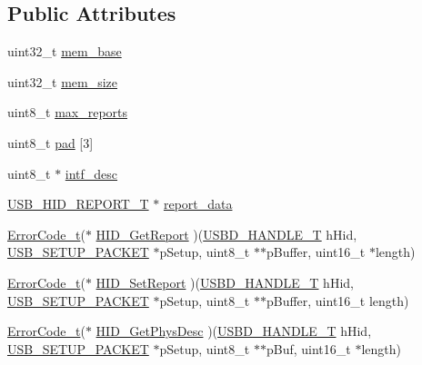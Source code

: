 \subsection*{Public Attributes}
\begin{DoxyCompactItemize}
\item 
uint32\+\_\+t \hyperlink{struct_u_s_b_d___h_i_d___i_n_i_t___p_a_r_a_m_aa53ec81868fce2b2ec22b3053f9d000a}{mem\+\_\+base}
\item 
uint32\+\_\+t \hyperlink{struct_u_s_b_d___h_i_d___i_n_i_t___p_a_r_a_m_a79aeddb1f4f4c9d77cacd17cf6c26499}{mem\+\_\+size}
\item 
uint8\+\_\+t \hyperlink{struct_u_s_b_d___h_i_d___i_n_i_t___p_a_r_a_m_a40d5967d9d4a156395871f4af996a15f}{max\+\_\+reports}
\item 
uint8\+\_\+t \hyperlink{struct_u_s_b_d___h_i_d___i_n_i_t___p_a_r_a_m_abe66157322df2a9f655708b8ae2795e9}{pad} \mbox{[}3\mbox{]}
\item 
uint8\+\_\+t $\ast$ \hyperlink{struct_u_s_b_d___h_i_d___i_n_i_t___p_a_r_a_m_ac1479de61c27a705a2df0e3941744671}{intf\+\_\+desc}
\item 
\hyperlink{group___u_s_b_d___h_i_d_gaaa1686adb431783ea4357e6899c0d39d}{U\+S\+B\+\_\+\+H\+I\+D\+\_\+\+R\+E\+P\+O\+R\+T\+\_\+T} $\ast$ \hyperlink{struct_u_s_b_d___h_i_d___i_n_i_t___p_a_r_a_m_a2e46476d82b7859a239feeadf457d0e8}{report\+\_\+data}
\item 
\hyperlink{error_8h_a905255056c349318139d94aa4523d516}{Error\+Code\+\_\+t}($\ast$ \hyperlink{struct_u_s_b_d___h_i_d___i_n_i_t___p_a_r_a_m_a6d109bfb14cb50b59193b1e767dadfce}{H\+I\+D\+\_\+\+Get\+Report} )(\hyperlink{group___u_s_b_d___core_gafdbb2204d929cb9d75736bd2b42342ac}{U\+S\+B\+D\+\_\+\+H\+A\+N\+D\+L\+E\+\_\+T} h\+Hid, \hyperlink{group___u_s_b_d___core_ga4a940f7627cc7e9f0bb693cc0fce8637}{U\+S\+B\+\_\+\+S\+E\+T\+U\+P\+\_\+\+P\+A\+C\+K\+ET} $\ast$p\+Setup, uint8\+\_\+t $\ast$$\ast$p\+Buffer, uint16\+\_\+t $\ast$length)
\item 
\hyperlink{error_8h_a905255056c349318139d94aa4523d516}{Error\+Code\+\_\+t}($\ast$ \hyperlink{struct_u_s_b_d___h_i_d___i_n_i_t___p_a_r_a_m_ac4269c1416c60a84e121763e6a7106c3}{H\+I\+D\+\_\+\+Set\+Report} )(\hyperlink{group___u_s_b_d___core_gafdbb2204d929cb9d75736bd2b42342ac}{U\+S\+B\+D\+\_\+\+H\+A\+N\+D\+L\+E\+\_\+T} h\+Hid, \hyperlink{group___u_s_b_d___core_ga4a940f7627cc7e9f0bb693cc0fce8637}{U\+S\+B\+\_\+\+S\+E\+T\+U\+P\+\_\+\+P\+A\+C\+K\+ET} $\ast$p\+Setup, uint8\+\_\+t $\ast$$\ast$p\+Buffer, uint16\+\_\+t length)
\item 
\hyperlink{error_8h_a905255056c349318139d94aa4523d516}{Error\+Code\+\_\+t}($\ast$ \hyperlink{struct_u_s_b_d___h_i_d___i_n_i_t___p_a_r_a_m_ab2e0f749e7aca1ff28edcf5c8da530a0}{H\+I\+D\+\_\+\+Get\+Phys\+Desc} )(\hyperlink{group___u_s_b_d___core_gafdbb2204d929cb9d75736bd2b42342ac}{U\+S\+B\+D\+\_\+\+H\+A\+N\+D\+L\+E\+\_\+T} h\+Hid, \hyperlink{group___u_s_b_d___core_ga4a940f7627cc7e9f0bb693cc0fce8637}{U\+S\+B\+\_\+\+S\+E\+T\+U\+P\+\_\+\+P\+A\+C\+K\+ET} $\ast$p\+Setup, uint8\+\_\+t $\ast$$\ast$p\+Buf, uint16\+\_\+t $\ast$length)
$$
\end{DoxyCompactItemize}
